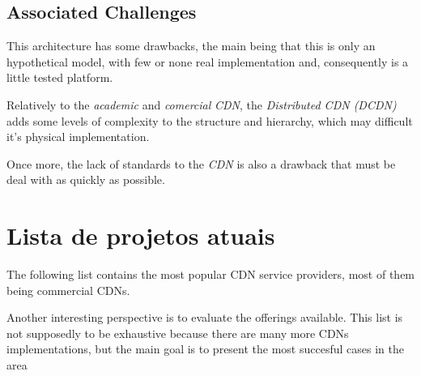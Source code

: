 \documentclass{llncs}
\begin{document}
\subsection{Associated Challenges}

This architecture has some drawbacks, the main being that this is
only an hypothetical model, with few or none real implementation
and, consequently is a little tested platform.

Relatively to the \emph{academic} and \emph{comercial} \textit{CDN},
the \emph{Distributed CDN (DCDN)} adds some levels of complexity to the structure and
hierarchy, which may difficult it's physical implementation.

Once more, the lack of standards\cite{IPTV} to the \textit{CDN} is also
a drawback that must be deal with as quickly as possible.




\section{Lista de projetos atuais}							%

The following list contains the most popular CDN service providers,
most of them being commercial CDNs. 

Another interesting perspective is to evaluate the offerings available.
This list is not supposedly to be exhaustive because there are many more
CDNs implementations, but the main goal is to present the most succesful
cases in the area
\end{document}

